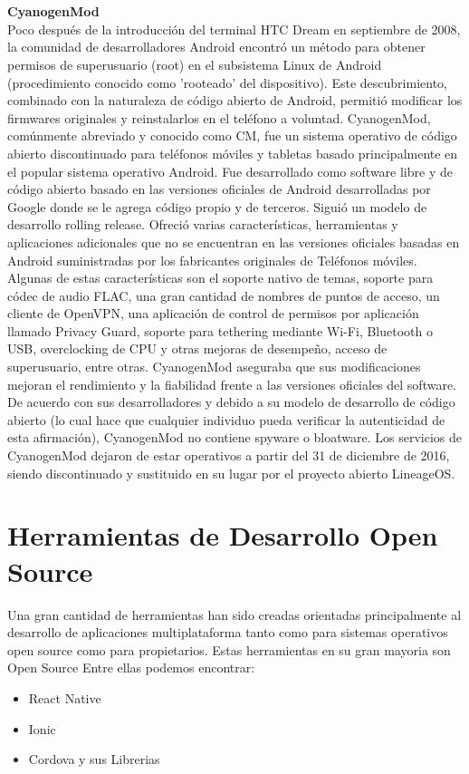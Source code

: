 \\
\\
{\bf CyanogenMod}
\\
Poco después de la introducción del terminal HTC Dream en septiembre de 2008, la comunidad de desarrolladores Android encontró un método para obtener permisos de superusuario (root) en el subsistema Linux de Android (procedimiento conocido como 'rooteado' del dispositivo). Este descubrimiento, combinado con la naturaleza de código abierto de Android, permitió modificar los firmwares originales y reinstalarlos en el teléfono a voluntad. 
CyanogenMod, comúnmente abreviado y conocido como CM, fue un sistema operativo de código abierto discontinuado para teléfonos móviles y tabletas basado principalmente en el popular sistema operativo Android. Fue desarrollado como software libre y de código abierto basado en las versiones oficiales de Android desarrolladas por Google donde se le agrega código propio y de terceros. Siguió un modelo de desarrollo rolling release.
Ofreció varias características, herramientas y aplicaciones adicionales que no se encuentran en las versiones oficiales basadas en Android suministradas por los fabricantes originales de Teléfonos móviles. Algunas de estas características son el soporte nativo de temas, soporte para códec de audio FLAC, una gran cantidad de nombres de puntos de acceso, un cliente de OpenVPN, una aplicación de control de permisos por aplicación llamado Privacy Guard, soporte para tethering mediante Wi-Fi, Bluetooth o USB, overclocking de CPU y otras mejoras de desempeño, acceso de superusuario, entre otras.
CyanogenMod aseguraba que sus modificaciones mejoran el rendimiento y la fiabilidad frente a las versiones oficiales del software. De acuerdo con sus desarrolladores y debido a su modelo de desarrollo de código abierto (lo cual hace que cualquier individuo pueda verificar la autenticidad de esta afirmación), CyanogenMod no contiene spyware o bloatware.
Los servicios de CyanogenMod dejaron de estar operativos a partir del 31 de diciembre de 2016, siendo discontinuado y sustituido en su lugar por el proyecto abierto LineageOS.

\section{Herramientas de Desarrollo Open Source}
Una gran cantidad de herramientas han sido creadas orientadas principalmente al desarrollo de aplicaciones multiplataforma tanto como para sistemas operativos open source como para propietarios. Estas herramientas en su gran mayoria son Open Source 
Entre ellas podemos encontrar:
\begin{itemize}
	 \item React Native
 	 \item Ionic
 	 \item Cordova y sus Librerias
\end{itemize}